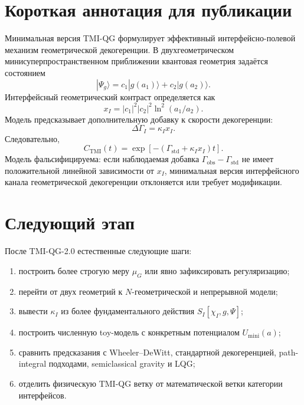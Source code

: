 \documentclass[12pt,a4paper]{article}
\newcommand{\std}{\mathrm{std}}
\newcommand{\obs}{\mathrm{obs}}
\begin{document}
\section{Короткая аннотация для публикации}

Минимальная версия TMI-QG формулирует эффективный интерфейсно-полевой механизм геометрической декогеренции. В двухгеометрическом минисуперпространственном приближении квантовая геометрия задаётся состоянием
\[
|\Psi_g\rangle=c_1|g(a_1)\rangle+c_2|g(a_2)\rangle.
\]
Интерфейсный геометрический контраст определяется как
\[
x_I=|c_1|^2|c_2|^2\ln^2(a_1/a_2).
\]
Модель предсказывает дополнительную добавку к скорости декогеренции:
\[
\Delta\Gamma_I=\kappa_I x_I.
\]
Следовательно,
\[
C_{\mathrm{TMI}}(t)
=
\exp[-(\Gamma_{\std}+\kappa_I x_I)t].
\]
Модель фальсифицируема: если наблюдаемая добавка \(\Gamma_{\obs}-\Gamma_{\std}\) не имеет положительной линейной зависимости от \(x_I\), минимальная версия интерфейсного канала геометрической декогеренции отклоняется или требует модификации.

\section{Следующий этап}

После TMI-QG-2.0 естественные следующие шаги:
\begin{enumerate}[label=\arabic*.]
\item построить более строгую меру \(\mu_G\) или явно зафиксировать регуляризацию;
\item перейти от двух геометрий к \(N\)-геометрической и непрерывной модели;
\item вывести \(\kappa_I\) из более фундаментального действия \(S_I[\chi_I,g,\Psi]\);
\item построить численную toy-модель с конкретным потенциалом \(U_{\mathrm{mini}}(a)\);
\item сравнить предсказания с Wheeler--DeWitt, стандартной декогеренцией, path-integral подходами, semiclassical gravity и LQG;
\item отделить физическую TMI-QG ветку от математической ветки категории интерфейсов.
\end{enumerate}
\end{document}
